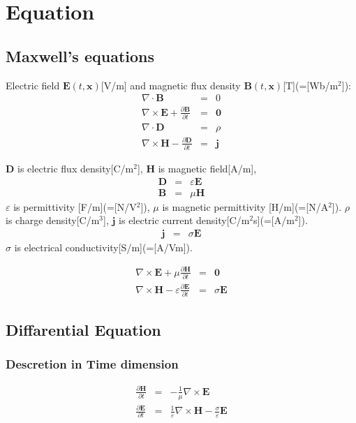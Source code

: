 \documentclass[10pt]{jsarticle}
\begin{document}
\title{}
\author{}
\date{}
\maketitle

\section{Equation}

\subsection{Maxwell's equations}

Electric field $\bm{E}(t,\bm{x})$[V/m]
and magnetic flux density $\bm{B}(t,\bm{x})$[T](=[Wb/m$^2$]):
\begin{eqnarray}
  \nabla\cdot\bm{B} & = & 0 \\
  \nabla\times\bm{E} + \frac{\partial\bm{B}}{\partial t} & = & \bm{0} \\
  \nabla\cdot\bm{D} & = & \rho \\
  \nabla\times\bm{H} - \frac{\partial\bm{D}}{\partial t} & = & \bm{j}
\end{eqnarray}

$\bm{D}$ is electric flux density[C/m$^2$], 
$\bm{H}$ is magnetic field[A/m],
\begin{eqnarray}
  \bm{D} & = & \varepsilon\bm{E} \\
  \bm{B} & = & \mu\bm{H}
\end{eqnarray}
$\varepsilon$ is permittivity [F/m](=[N/V$^2$]),
$\mu$ is magnetic permittivity [H/m](=[N/A$^2$]).
$\rho$ is charge density[C/m$^3$],
$\bm{j}$ is electric current density[C/m$^2$s](=[A/m$^2$]).
\begin{eqnarray}
  \bm{j} & = & \sigma\bm{E}
\end{eqnarray}
$\sigma$ is electrical conductivity[S/m](=[A/Vm]).

\begin{eqnarray}
  \nabla\times\bm{E} + \mu\frac{\partial\bm{H}}{\partial t} & = & \bm{0} \\
  \nabla\times\bm{H} - \varepsilon\frac{\partial\bm{E}}{\partial t} & = & \sigma\bm{E}
\end{eqnarray}

\subsection{Diffarential Equation}
\subsubsection{Descretion in Time dimension}

\begin{eqnarray}
 \frac{\partial\bm{H}}{\partial t} & = &
 	- \frac{1}{\mu}\nabla\times\bm{E}\\
 \frac{\partial\bm{E}}{\partial t} & = &
 	\frac{1}{\varepsilon}\nabla\times\bm{H}
	- \frac{\sigma}{\varepsilon}\bm{E}
\end{eqnarray}
\end{document}
